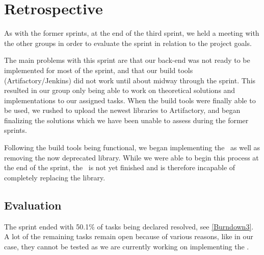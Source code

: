 \section{Retrospective}
As with the former sprints, at the end of the third sprint, we held a meeting
with the other groups in order to evaluate the sprint in relation to the
project goals.\nl

The main problems with this sprint are that our back-end was not
ready to be implemented for most of the sprint, and that our build tools
(Artifactory/Jenkins) did not work until about midway through the sprint.
This resulted in our group only being able to work on theoretical solutions and
implementations to our assigned tasks. When the build tools were finally able to
be used, we rushed to upload the newest libraries to Artifactory, and began
finalizing the solutions which we have been unable to assess during the former
sprints.\nl

Following the build tools being functional, we began implementing the \rlib\ as
well as removing the now deprecated  library. While we were able
to begin this process at the end of the sprint, the \rlib\ is not yet finished
and is therefore incapable of completely replacing the  library.

\subsection{Evaluation}
The sprint ended with 50.1\% of tasks being declared resolved, see
\autoref{Burndown3}. A lot of the remaining tasks remain open because of various
reasons, like in our case, they cannot be tested as we are currently working on
implementing the \rlib. 


